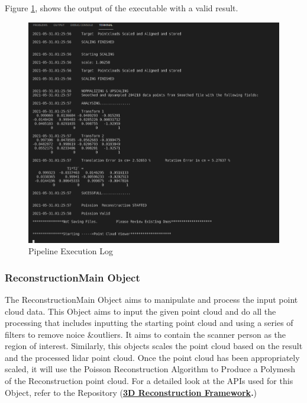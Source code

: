 \documentclass[12pt]{report}
\begin{document}
Figure \ref{fig:pipeline_log}, shows the output of the executable with a valid result.
\enlargethispage{\baselineskip}
\begin{figure}[H]%
  \centering
 \includegraphics[width=1\textwidth]{log.png}
\caption{Pipeline Execution Log}
\label{fig:pipeline_log} 
\end{figure}






\subsubsection*{ReconstructionMain Object}
The ReconstructionMain Object aims to manipulate and process the input point cloud data.
This Object aims to input the given point cloud and do all the processing that includes inputting the starting point cloud and using a series of filters to remove noice \&outliers. It aims to contain the scanner person as the region of interest. 
Similarly, this objects scales the point cloud based on the result and the processed lidar point cloud.
Once the point cloud has been appropriately scaled, it will use the Poisson Reconstruction Algorithm to Produce a Polymesh of the Reconstruction point cloud.
For a detailed look at the APIs used for this Object, refer to the Repository (\textbf{\href{https://github.com/esteban-andrade/3D-Reconstructrion-Scanner} {3D Reconstruction Framework}.})
\end{document}

